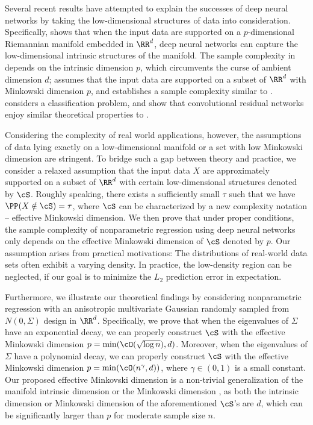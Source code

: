 Several recent results have attempted to explain the successes of deep neural networks
by taking the low-dimensional structures of data into consideration\citep{chen2019efficient,chen2022nonparametric,nakada2020adaptive,liu2021besov,schmidt2019deep}. Specifically, \citet{chen2022nonparametric} shows that when the input data are supported on a $p$-dimensional Riemannian manifold embedded in $\RR^d$, deep neural networks can capture the  low-dimensional  intrinsic structures of the manifold. The sample complexity in \citet{chen2022nonparametric} depends on the intrinsic dimension $p$, which circumvents the curse of ambient dimension $d$; \citet{nakada2020adaptive} assumes that the input data are supported on a subset of $\RR^d$ with Minkowski dimension $p$, and establishes a sample complexity similar to \citet{chen2022nonparametric}. \citet{liu2021besov} considers a  classification problem, and show that convolutional residual networks enjoy similar theoretical properties  to \citet{chen2022nonparametric}.

Considering the complexity of real world applications, however, the assumptions of data lying exactly on a low-dimensional manifold or a set with low Minkowski dimension are stringent. To bridge such a gap between theory and practice, we consider a relaxed assumption that the input data $X$ are approximately supported on a subset of $\RR^d$ with certain low-dimensional structures denoted by $\cS$. Roughly speaking, there exists a sufficiently small $\tau$ such that we have $\PP(X\notin\cS)=\tau$, where $\cS$ can be characterized by a new complexity notation -- effective Minkowski dimension. We then prove that under proper conditions, the sample complexity of nonparametric regression using deep neural networks only depends on the effective Minkowski dimension of $\cS$ denoted by $p$. Our assumption arises from practical motivations: The distributions of real-world data sets often exhibit a varying density. In practice, the low-density region can be neglected, if our goal is to minimize the $L_2$ prediction error in expectation. 

Furthermore, we illustrate our theoretical findings by considering nonparametric regression with an anisotropic multivariate Gaussian randomly sampled from $N(0,\Sigma)$ design in $\RR^d$. Specifically, we prove that when the eigenvalues of $\Sigma$ have an exponential decay, we can properly construct $\cS$ with the effective Minkowski dimension $p=\min(\cO(\sqrt{\log n}),d)$. Moreover, when the eigenvalues of $\Sigma$ have a polynomial decay, we can properly construct $\cS$ with the effective Minkowski dimension $p=\min(\cO(n^\gamma,d))$, where $\gamma\in(0,1)$ is a small constant. Our proposed effective Minkovski dimension is a non-trivial generalization of the manifold intrinsic dimension \citep{chen2022nonparametric} or the Minkowski dimension  \citep{nakada2020adaptive}, as both the intrinsic dimension or Minkowski dimension of the aforementioned $\cS$'s are $d$, which can be significantly larger than $p$ for moderate sample size $n$.

